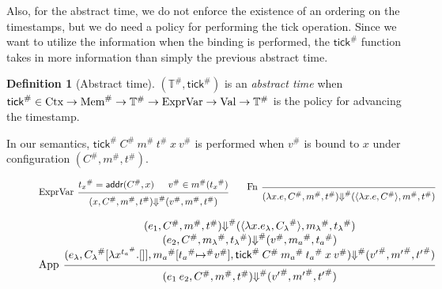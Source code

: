 \documentclass[acmsmall,screen]{acmart}
\theoremstyle{definition}
\newtheorem{definition}{Definition}[section]
\newcommand*{\A}[1]{{#1}^{\#}}
\newcommand*{\ExprVar}{\text{ExprVar}}
\newcommand*{\Time}{\mathbb{T}}
\newcommand*{\ATime}{\A{\Time}}
\newcommand*{\Ctx}[1]{\text{Ctx}\vphantom{#1}}
\newcommand*{\Value}[1]{\text{Val}\vphantom{#1}}
\newcommand*{\mem}{m}
\newcommand*{\AMem}[1]{\A{\text{Mem}}\vphantom{#1}}
\newcommand*{\addr}{\mathsf{addr}}
\newcommand*{\tick}{\mathsf{tick}}
\begin{document}
Also, for the abstract time, we do not enforce the existence of an ordering on the timestamps, but we do need a policy for performing the tick operation.
Since we want to utilize the information when the binding is performed, the $\A{\tick}$ function takes in more information than simply the previous abstract time.
\begin{definition}[Abstract time]
  $(\ATime,\A{\tick})$ is an \emph{abstract time} when $\A{\tick}\in\Ctx{\ATime}\rightarrow\AMem{\ATime}\rightarrow\ATime\rightarrow\ExprVar\rightarrow\Value{\ATime}\rightarrow\ATime$ is the policy for advancing the timestamp.
\end{definition}
In our semantics, $\A{\tick}\:\A{C}\:\A{\mem}\:\A{t}\:x\:\A{v}$ is performed when $\A{v}$ is bound to $x$ under configuration $(\A{C},\A{\mem},\A{t})$.
\begin{figure}[htb]
  \footnotesize
  \[
    \begin{prooftree}
      \hypo{\A{t_{x}}=\addr(\A{C},x)}
      \hypo{\A{v}\in\A{\mem}(\A{t_{x}})}
      \infer[left label=ExprVar]2{
      (x, \A{C}, \A{\mem}, \A{t})
      \A{\Downarrow}
      (\A{v}, \A{\mem}, \A{t})
      }
    \end{prooftree}\qquad
    \begin{prooftree}
      \infer[left label=Fn]0{
      (\lambda x.e, \A{C}, \A{\mem}, \A{t})
      \A{\Downarrow}
      (\langle\lambda x.e, \A{C}\rangle, \A{\mem}, \A{t})
      }
    \end{prooftree}
  \]

  \[
    \begin{prooftree}
      \hypo{
        \begin{matrix}
          (e_{1}, \A{C}, \A{\mem}, \A{t})
          \A{\Downarrow}
          (\langle\lambda x.e_{\lambda}, \A{C_{\lambda}}\rangle, \A{\mem_{\lambda}}, \A{t_{\lambda}}) \\
          (e_{2}, \A{C}, \A{\mem_{\lambda}}, \A{t_{\lambda}})
          \A{\Downarrow}
          (\A{v}, \A{\mem_{a}}, \A{t_{a}})                                                            \\
          (e_{\lambda}, \A{C_{\lambda}}[\lambda x^{\A{t_{a}}}.[]], \A{\mem_{a}}[\A{t_{a}}\A{\mapsto} \A{v}], \A{\tick}\:\A{C}\:\A{\mem_a}\:\A{t_{a}}\:x\:\A{v})
          \A{\Downarrow}
          (\A{v'}, \A{\mem'},\A{t'})
        \end{matrix}
      }
      \infer[left label={App}]1{
      (e_{1}\:e_{2}, \A{C}, \A{\mem}, \A{t})
      \A{\Downarrow}
      (\A{v'}, \A{\mem'},\A{t'})
      }
    \end{prooftree}
  \]


\end{figure}
\end{document}
